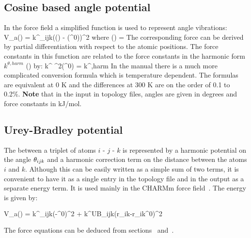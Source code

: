 \subsection{Cosine based angle potential}
\label{subsec:G96angle}
In the  force field a simplified function is used to represent angle
vibrations:
\beq
V_a(\tijk) = \half k^{\theta}_{ijk}\left(\cos(\tijk) - \cos(\tijk^0)\right)^2
\eeq
where 
\beq
\cos(\tijk) = 
\eeq
The corresponding force can be derived by partial differentiation with respect
to the atomic positions. The force constants in this function are related
to the force constants in the harmonic form $k^{\theta,harm}$
() by:
\beq
k^{\theta} \sin^2(\tijk^0) = k^{\theta,harm}
\eeq
In the  manual there is a much more complicated conversion formula
which is temperature dependent. The formulas are equivalent at 0 K
and the differences at 300 K are on the order of 0.1 to 0.2\%.
{\bf Note} that in the input in topology files, angles are given in degrees and
force constants in kJ/mol.

\subsection{Urey-Bradley potential}
\label{subsec:Urey-Bradley}
The  between a triplet
of atoms $i$ - $j$ - $k$ is represented by a harmonic potential on the
angle $\theta_{ijk}$ and a harmonic correction term on the distance between
the atoms $i$ and $k$. Although this can be easily written as a simple
sum of two terms, it is convenient to have it as a single entry in the
topology file and in the output as a separate energy term. It is used mainly
in the CHARMm force field~\cite{BBrooks83}. The energy is given by:

\beq
V_a(\tijk) = \half k^{\theta}_{ijk}(\tijk-\tijk^0)^2 + \half k^{UB}_{ijk}(r_{ik}-r_{ik}^0)^2
\eeq

The force equations can be deduced from sections~
and~.

